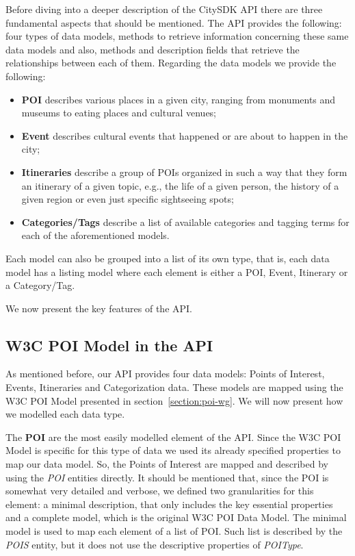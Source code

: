 \documentclass[times]{ettauth}
\begin{document}
Before diving into a deeper description of the CitySDK API there are three fundamental aspects that should be mentioned.
The API provides the following: four types of data models, methods to retrieve information concerning these same data models and also, methods and description fields that retrieve the relationships between each of them.
Regarding the data models we provide the following:
\begin{itemize}
\item \textbf{\ac{POI}} describes various places in a given city, ranging from monuments and museums to eating places and cultural venues; 
\item \textbf{Event} describes cultural events that happened or are about to happen in the city;
\item \textbf{Itineraries} describe a group of \acp{POI} organized in such a way that they form an itinerary of a given topic, e.g., the life of a given person, the history of a given region or even just specific sightseeing spots;
\item \textbf{Categories/Tags} describe a list of available categories and tagging terms for each of the aforementioned models.
\end{itemize}

Each model can also be grouped into a list of its own type, that is, each data model has a listing model where each element is either a \ac{POI}, Event, Itinerary or a Category/Tag.

We now present the key features of the API.

\subsection{W3C POI Model in the API}
\label{section:w3cpoi}
As mentioned before, our API provides four data models: Points of Interest, Events, Itineraries and Categorization data. These models are mapped using the W3C POI Model presented in section~\ref{section:poi-wg}. We will now present how we modelled each data type.

The \textbf{\acf{POI}} are the most easily modelled element of the API. Since the W3C POI Model is specific for this type of data we used its already specified properties to map our data model. So, the Points of Interest are mapped and described by using the \textit{POI} entities directly. It should be mentioned that, since the \ac{POI} is somewhat very detailed and verbose, we defined two granularities for this element: a minimal description, that only includes the key essential properties and a complete model, which is the original W3C POI Data Model. The minimal model is used to map each element of a list of \ac{POI}. Such list is described by the \textit{POIS} entity, but it does not use the descriptive properties of \textit{POIType}.
\end{document}
